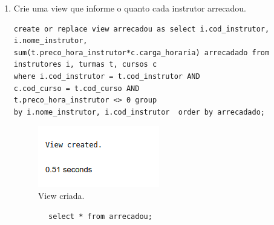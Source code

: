 \documentclass[
article,			%
11pt,				%
oneside,			%
a4paper,			%
english,			%
brazil,				%
sumario=tradicional
]{abntex2}
\begin{document}
	
	\frenchspacing 
	
	
	\maketitle
	\begin{enumerate}
		\item Crie uma view que informe o quanto cada instrutor
		arrecadou.
				\begin{verbatim}
create or replace view arrecadou as select i.cod_instrutor, i.nome_instrutor,
sum(t.preco_hora_instrutor*c.carga_horaria) arrecadado from
instrutores i, turmas t, cursos c 
where i.cod_instrutor = t.cod_instrutor AND
c.cod_curso = t.cod_curso AND
t.preco_hora_instrutor <> 0 group 
by i.nome_instrutor, i.cod_instrutor  order by arrecadado;
				\end{verbatim}
				
				\begin{center}
					\begin{figure}[H]
						\centering
						\includegraphics[scale=0.5]{./imagens/at-01.png}
						\caption{View criada.}
						\label{rota-1}
					\end{figure}
				\end{center}
				\begin{verbatim}
		select * from arrecadou;
			\end{verbatim}
			

\end{enumerate}
\end{document}
